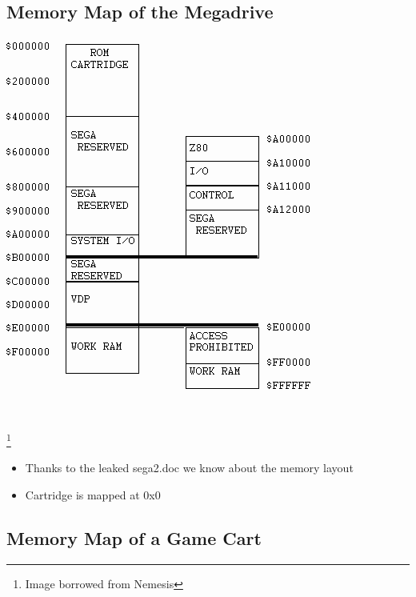 \documentclass{beamer}
\begin{document}

\subsection{Memory Map of the Megadrive}

\begin{frame}[fragile]
\frametitle{\insertsubsection}

\begin{center}
\includegraphics[height=.5\textheight]{img/mmap.png}
{~~~~\raggedright \footnote{Image borrowed from Nemesis}}
\end{center}

\begin{itemize}
\item {\small Thanks to the leaked sega2.doc we know about the memory layout}
\item {\small Cartridge is mapped at 0x0}
\end{itemize}

\end{frame}


\subsection{Memory Map of a Game Cart}
\end{document}
